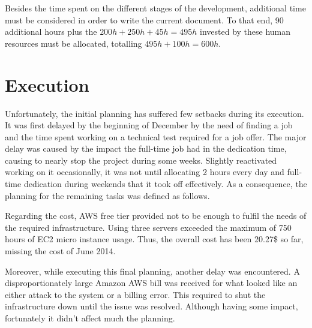 Besides the time spent on the different stages of the development, additional time must be considered in order to write the current document. To that end, 90 additional hours plus the $200h + 250h + 45h = 495h$ invested by these human resources must be allocated, totalling $495h + 100h = 600h$.

\section{Execution}

Unfortunately, the initial planning has suffered few setbacks during its execution. It was first delayed by the beginning of December by the need of finding a job and the time spent working on a technical test required for a job offer. The major delay was caused by the impact the full-time job had in the dedication time, causing to nearly stop the project during some weeks. Slightly      reactivated working on it occasionally, it was not until allocating 2 hours every day and full-time dedication during weekends that it took off effectively. As a consequence, the planning for the remaining tasks was defined as follows.

Regarding the cost, AWS free tier provided not to be enough to fulfil the needs of the required infrastructure. Using three servers exceeded the maximum of 750 hours of EC2 micro instance usage. Thus, the overall cost has been 20.27\$ so far, missing the cost of June 2014.

Moreover, while executing this final planning, another delay was encountered. A disproportionately large Amazon AWS bill was received for what looked like an either attack to the system or a billing error. This required to shut the infrastructure down until the issue was resolved. Although having some impact, fortunately it didn't affect much the planning.

